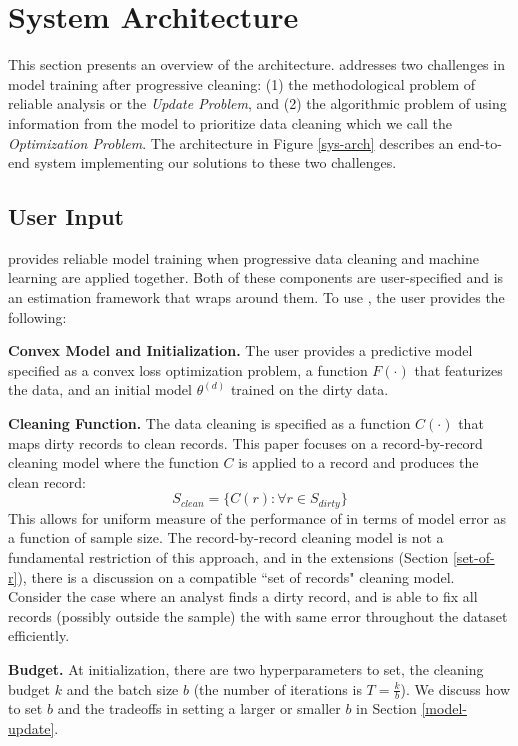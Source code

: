 \section{System Architecture}\label{arch}
This section presents an overview of the \sys architecture.
\sys addresses two challenges in model training after progressive cleaning: (1) the methodological problem of reliable analysis or the \emph{Update Problem}, and (2) the algorithmic problem of using information from the model to prioritize data cleaning which we call the \emph{Optimization Problem}.
The \sys architecture in Figure \ref{sys-arch} describes an end-to-end system implementing our solutions to these two challenges.

\subsection{User Input}\label{uinp}
\sys provides reliable model training when progressive data cleaning and machine learning are applied together.
Both of these components are user-specified and \sys is an estimation framework that wraps around them.
To use \sys, the user provides the following:

\noindent\textbf{Convex Model and Initialization. } The user provides a predictive model specified as a convex loss optimization problem, a function $F(\cdot)$ that featurizes the data, and an initial model $\theta^{(d)}$ trained on the dirty data. 

\vspace{0.25em}

\noindent\textbf{Cleaning Function. } The data cleaning is specified as a function $C(\cdot)$ that maps dirty records to clean records. This paper focuses on a record-by-record cleaning model where the function $C$ is applied to a record and produces the clean record:
\[
S_{clean} = \{C(r) : \forall r \in S_{dirty}\}
\]
This allows for uniform measure of the performance of \sys in terms of model error as a function of sample size. The record-by-record cleaning model is not a fundamental restriction of this approach, and in the extensions (Section \ref{set-of-r}), there is a discussion on a compatible ``set of records" cleaning model. Consider the case where an analyst finds a dirty record, and is able to fix all records (possibly outside the sample) the with same error throughout the dataset efficiently.

\vspace{0.25em}

\noindent\textbf{Budget. } At initialization, there are two hyperparameters to set, the cleaning budget $k$ and the batch size $b$ (the number of iterations is $T = \frac{k}{b}$).
We discuss how to set $b$ and the tradeoffs in setting a larger or smaller $b$ in Section \ref{model-update}.

